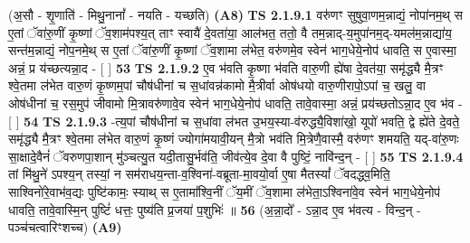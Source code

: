 \documentclass[17pt]{extarticle}
\begin{document}
                  \newline
                      (अ॒सौ - शृ॒णाति॑ - मिथु॒नानां᳚ - नयति - यच्छति)  \textbf{(A8)} \newline \newline
                                        \textbf{ TS 2.1.9.1} \newline
                  वरु॑णꣳ सुषुवा॒णम॒न्नाद्यं॒ नोपा॑नम॒थ् स ए॒तां ॅवा॑रु॒णीं कृ॒ष्णां ॅव॒शाम॑पश्य॒त् ताꣳ स्वायै॑ दे॒वता॑या॒ आल॑भत॒ ततो॒ वै तम॒न्नाद्-य॒मुपा॑नम॒द्-यमल॑म॒न्नाद्या॑य॒ सन्त॑म॒न्नाद्यं॒ नोप॒नमे॒थ् स ए॒तां ॅवा॑रु॒णीं कृ॒ष्णां ॅव॒शामा ल॑भेत॒ वरु॑णमे॒व स्वेन॑ भाग॒धेये॒नोप॑ धावति॒ स ए॒वास्मा॒ अन्नं॒ प्र य॑च्छत्यन्ना॒द - [  ] \textbf{  53} \newline
                  \newline
                                \textbf{ TS 2.1.9.2} \newline
                  ए॒व भ॑वति कृ॒ष्णा भ॑वति वारु॒णी ह्ये॑षा दे॒वत॑या॒ समृ॑द्ध्यै मै॒त्रꣳ श्वे॒तमा ल॑भेत वारु॒णं कृ॒ष्णम॒पां चौष॑धीनां च स॒धांवन्न॑कामो मै॒त्रीर्वा ओष॑धयो वारु॒णीरापो॒ऽपां च॒ खलु॒ वा ओष॑धीनां च॒ रस॒मुप॑ जीवामो मि॒त्रावरु॑णावे॒व स्वेन॑ भाग॒धेये॒नोप॑ धावति॒ तावे॒वास्मा॒ अन्नं॒ प्रय॑च्छतोऽन्ना॒द ए॒व भ॑व - [  ] \textbf{  54} \newline
                  \newline
                                \textbf{ TS 2.1.9.3} \newline
                  -त्य॒पां चौष॑धीनां च स॒धांवा ल॑भत उ॒भय॒स्या-व॑रुद्ध्यै॒विशा॑खो॒ यूपो॑ भवति॒ द्वे ह्ये॑ते दे॒वते॒ समृ॑द्ध्यै मै॒त्रꣳ श्वे॒तमा ल॑भेत वारु॒णं कृ॒ष्णं ज्योगा॑मयावी॒यन् मै॒त्रो भव॑ति मि॒त्रेणै॒वास्मै॒ वरु॑णꣳ शमयति॒ यद्-वा॑रु॒णः सा॒क्षादे॒वैनं॑ ॅवरुणपा॒शान् मु॑ञ्चत्यु॒त यदी॒तासु॒र्भव॑ति॒ जीव॑त्ये॒व दे॒वा वै पुष्टिं॒ नावि॑न्द॒न् - [  ] \textbf{  55} \newline
                  \newline
                                \textbf{ TS 2.1.9.4} \newline
                  तां मि॑थु॒ने॑ ऽपश्य॒न् तस्यां॒ न सम॑राधय॒न्ता-व॒श्विना॑-वब्रूता-मा॒वयो॒र्वा ए॒षा मैतस्यां᳚ ॅवदद्ध्व॒मिति॒ साश्विनो॑रे॒वाभ॑व॒द्यः पुष्टि॑कामः॒ स्याथ् स ए॒तामा᳚श्वि॒नीं ॅय॒मीं ॅव॒शामा ल॑भेता॒ऽश्विना॑वे॒व स्वेन॑ भाग॒धेये॒नोप॑ धावति॒ तावे॒वास्मि॒न् पुष्टिं॑ धत्तः॒ पुष्य॑ति प्र॒जया॑ प॒शुभिः॑ ॥ \textbf{  56} \newline
                  \newline
                      (अ॒न्ना॒दो᳚ - ऽन्ना॒द ए॒व भ॑वत्य - विन्द॒न् - पञ्च॑चत्वारिꣳशच्च)  \textbf{(A9)} \newline \newline
\end{document}
